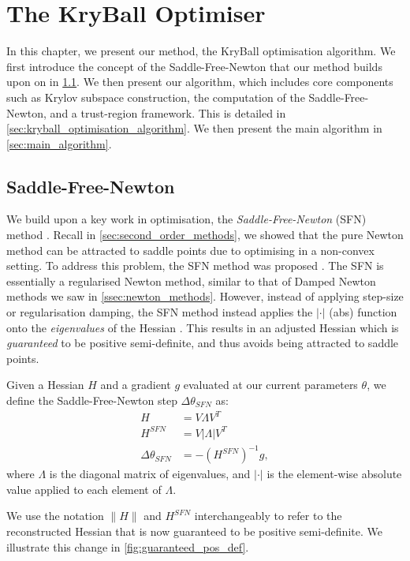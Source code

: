 \chapter{The KryBall Optimiser}
\label{chap:method}

In this chapter, we present our method, the KryBall optimisation algorithm. We first introduce the concept of the Saddle-Free-Newton that our method builds upon on in \cref{sec:saddle_free_newton}. We then present our algorithm, which includes core components such as Krylov subspace construction, the computation of the Saddle-Free-Newton, and a trust-region framework. This is detailed in \cref{sec:kryball_optimisation_algorithm}. We then present the main algorithm in \cref{sec:main_algorithm}.

\section{Saddle-Free-Newton}
\label{sec:saddle_free_newton}

We build upon a key work in optimisation, the \textit{Saddle-Free-Newton} (SFN) method \citep{dauphin2014sfn}. Recall in \cref{sec:second_order_methods}, we showed that the pure Newton method can be attracted to saddle points due to optimising in a non-convex setting. To address this problem, the SFN method was proposed \citep{dauphin2014sfn}. The SFN is essentially a regularised Newton method, similar to that of Damped Newton methods we saw in \cref{ssec:newton_methods}. However, instead of applying step-size or regularisation damping, the SFN method instead applies the $|\cdot|$ (abs) function onto the \textit{eigenvalues} of the Hessian \cite{dauphin2014sfn}. This results in an adjusted Hessian which is \textit{guaranteed} to be positive semi-definite, and thus avoids being attracted to saddle points. 

\begin{definition}
    Given a Hessian $H$ and a gradient $g$ evaluated at our current parameters $\theta$, we define the Saddle-Free-Newton step $\Delta \theta_{SFN}$ as:
    \begin{align}
        H &= V \Lambda V^T \\
        H^{SFN} &= V |\Lambda| V^T \\
        \Delta \theta_{SFN} &= -(H^{SFN})^{-1} g,
    \end{align}
    where $\Lambda$ is the diagonal matrix of eigenvalues, and $|\cdot|$ is the element-wise absolute value applied to each element of $\Lambda$.
\end{definition}
We use the notation $\| H \|$ and $H^{SFN}$ interchangeably to refer to the reconstructed Hessian that is now guaranteed to be positive semi-definite. We illustrate this change in \cref{fig:guaranteed_pos_def}.

